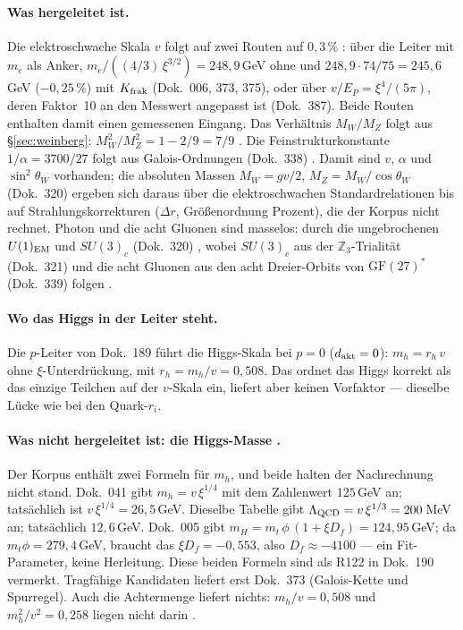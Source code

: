 \paragraph{Was hergeleitet ist.}
Die elektroschwache Skala $v$ folgt auf zwei Routen auf $0{,}3\,\%$ \KM:
über die Leiter mit $m_e$ als Anker, $m_e/((4/3)\,\xi^{3/2}) = 248{,}9$\,GeV
ohne und $248{,}9\cdot 74/75 = 245{,}6$\,GeV ($-0{,}25\,\%$) mit
$K_{\rm frak}$ (Dok.~006, 373, 375), oder über $v/E_P = \xi^4/(5\pi)$, deren
Faktor~10 an den Messwert angepasst ist (Dok.~387). Beide Routen enthalten
damit einen gemessenen Eingang.
Das Verhältnis $M_W/M_Z$ folgt aus §\ref{sec:weinberg}:
$M_W^2/M_Z^2 = 1 - 2/9 = 7/9$ \KM. Die Feinstrukturkonstante
$1/\alpha = 3700/27$ folgt aus Galois-Ordnungen (Dok.~338) \KM. Damit
sind $v$, $\alpha$ und $\sin^2\theta_W$ vorhanden; die absoluten Massen
$M_W = gv/2$, $M_Z = M_W/\cos\theta_W$ (Dok.~320) ergeben sich daraus über
die elektroschwachen Standardrelationen bis auf Strahlungskorrekturen
($\Delta r$, Größenordnung Prozent), die der Korpus nicht rechnet.
Photon und die acht Gluonen sind masselos: durch die ungebrochenen
$U(1)_{\rm EM}$ und $SU(3)_c$ (Dok.~320) \BM, wobei $SU(3)_c$ aus der
$\mathbb Z_3$-Trialität (Dok.~321) und die acht Gluonen aus den acht
Dreier-Orbits von $\mathrm{GF}(27)^*$ (Dok.~339) folgen \BM.

\paragraph{Wo das Higgs in der Leiter steht.}
Die $p$-Leiter von Dok.~189 führt die Higgs-Skala bei $p = 0$
($d_{\rm akt} = 0$): $m_h = r_h\,v$ ohne $\xi$-Unterdrückung, mit
$r_h = m_h/v = 0{,}508$. Das ordnet das Higgs korrekt als das einzige
Teilchen auf der $v$-Skala ein, liefert aber keinen Vorfaktor --- dieselbe
Lücke wie bei den Quark-$r_i$.

\paragraph{Was nicht hergeleitet ist: die Higgs-Masse \XM.}
Der Korpus enthält zwei Formeln für $m_h$, und beide halten der
Nachrechnung nicht stand. Dok.~041 gibt $m_h = v\,\xi^{1/4}$ mit dem
Zahlenwert $125$\,GeV an; tatsächlich ist $v\,\xi^{1/4} = 26{,}5$\,GeV.
Dieselbe Tabelle gibt $\Lambda_{\rm QCD} = v\,\xi^{1/3} = 200$\,MeV an;
tatsächlich $12{,}6$\,GeV. Dok.~005 gibt
$m_H = m_t\,\phi\,(1+\xi D_f) = 124{,}95$\,GeV; da $m_t\phi = 279{,}4$\,GeV,
braucht das $\xi D_f = -0{,}553$, also $D_f\approx-4100$ --- ein
Fit-Parameter, keine Herleitung. Diese beiden Formeln sind als R122 in
Dok.~190 vermerkt. Tragfähige Kandidaten liefert erst Dok.~373 (Galois-Kette
und Spurregel).
Auch die Achtermenge liefert nichts: $m_h/v = 0{,}508$ und
$m_h^2/v^2 = 0{,}258$ liegen nicht darin \XM.

